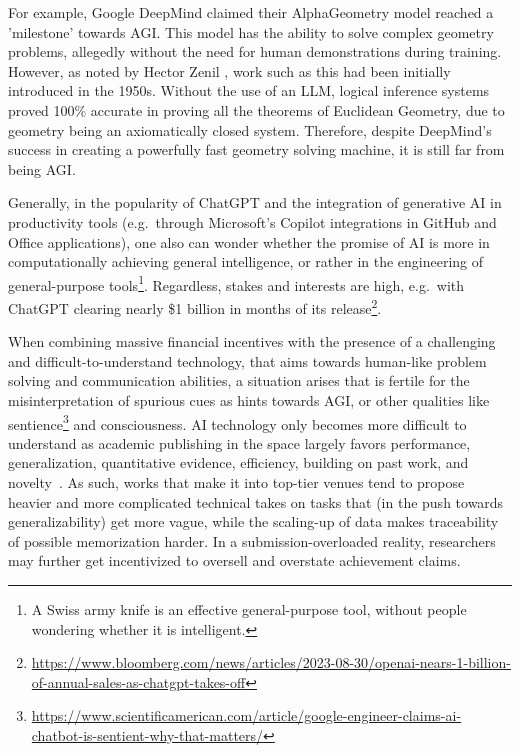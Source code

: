 \documentclass{article}
\theoremstyle{plain}
\theoremstyle{definition}
\theoremstyle{remark}
\begin{document}
For example, Google DeepMind claimed their AlphaGeometry model \cite{trinh2024geometry} reached a 'milestone' towards AGI. This model has the ability to solve complex geometry problems, allegedly without the need for human demonstrations during training. However, as noted by Hector Zenil \cite{hector2024linkedin}, work such as this had been initially introduced in the 1950s. Without the use of an LLM, logical inference systems proved 100\% accurate in proving all the theorems of Euclidean Geometry, due to geometry being an axiomatically closed system. Therefore, despite DeepMind's success in creating a powerfully fast geometry solving machine, it is still far from being AGI.

Generally, in the popularity of ChatGPT and the integration of generative AI in productivity tools (e.g.\ through Microsoft's Copilot integrations in GitHub and Office applications), one also can wonder whether the promise of AI is more in computationally achieving general intelligence, or rather in the engineering of general-purpose tools\footnote{A Swiss army knife is an effective general-purpose tool, without people wondering whether it is intelligent.}. Regardless, stakes and interests are high, e.g.\ with ChatGPT clearing nearly \$1 billion in months of its release\footnote{\url{https://www.bloomberg.com/news/articles/2023-08-30/openai-nears-1-billion-of-annual-sales-as-chatgpt-takes-off}}.

When combining massive financial incentives with the presence of a challenging and difficult-to-understand technology, that aims towards human-like problem solving and communication abilities, a situation arises that is fertile for the misinterpretation of spurious cues as hints towards AGI, or other qualities like sentience\footnote{\url{https://www.scientificamerican.com/article/google-engineer-claims-ai-chatbot-is-sentient-why-that-matters/}} and consciousness. AI technology only becomes more difficult to understand as academic publishing in the space largely favors performance, generalization, quantitative evidence, efficiency, building on past work, and novelty~\cite{values_in_ML}. As such, works that make it into top-tier venues tend to propose heavier and more complicated technical takes on tasks that (in the push towards generalizability) get more vague, while the scaling-up of data makes traceability of possible memorization harder. In a submission-overloaded reality, researchers may further get incentivized to oversell and overstate achievement claims.
\end{document}
